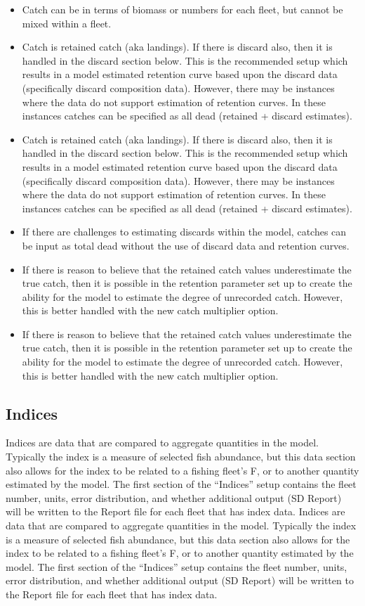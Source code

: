 \begin{itemize}
	\item Catch can be in terms of biomass or numbers for each fleet, but cannot be mixed within a fleet.
	\item Catch is retained catch (aka landings). If there is discard also, then it is handled in the discard section below. This is the recommended setup which results in a model estimated retention curve based upon the discard data (specifically discard composition data). However, there may be instances where the data do not support estimation of retention curves. In these instances catches can be specified as all dead (retained + discard estimates).
	\item Catch is retained catch (aka landings). If there is discard also, then it is handled in the discard section below. This is the recommended setup which results in a model estimated retention curve based upon the discard data (specifically discard composition data). However, there may be instances where the data do not support estimation of retention curves. In these instances catches can be specified as all dead (retained + discard estimates).
	\item If there are challenges to estimating discards within the model, catches can be input as total dead without the use of discard data and retention curves.
	\item If there is reason to believe that the retained catch values underestimate the true catch, then it is possible in the retention parameter set up to create the ability for the model to estimate the degree of unrecorded catch. However, this is better handled with the new catch multiplier option.
	\item If there is reason to believe that the retained catch values underestimate the true catch, then it is possible in the retention parameter set up to create the ability for the model to estimate the degree of unrecorded catch. However, this is better handled with the new catch multiplier option.
\end{itemize}


\subsection{Indices}
Indices are data that are compared to aggregate quantities in the model. Typically the index is a measure of selected fish abundance, but this data section also allows for the index to be related to a fishing fleet's F, or to another quantity estimated by the model. The first section of the ``Indices'' setup contains the fleet number, units, error distribution, and whether additional output (SD Report) will be written to the Report file for each fleet that has index data.
Indices are data that are compared to aggregate quantities in the model. Typically the index is a measure of selected fish abundance, but this data section also allows for the index to be related to a fishing fleet's F, or to another quantity estimated by the model. The first section of the ``Indices'' setup contains the fleet number, units, error distribution, and whether additional output (SD Report) will be written to the Report file for each fleet that has index data.

